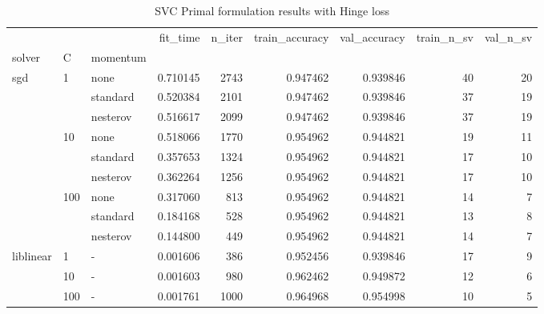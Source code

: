 \begin{table}[H]
\centering
\caption{SVC Primal formulation results with Hinge loss}
\label{primal_svc_hinge_cv_results}
\begin{tabular}{lllrrrrrr}
\toprule
          &     &   &  fit\_time &  n\_iter &  train\_accuracy &  val\_accuracy &  train\_n\_sv &  val\_n\_sv \\
solver & C & momentum &           &         &                 &               &             &           \\
\midrule
sgd & 1   & none &  0.710145 &    2743 &        0.947462 &      0.939846 &          40 &        20 \\
          &     & standard &  0.520384 &    2101 &        0.947462 &      0.939846 &          37 &        19 \\
          &     & nesterov &  0.516617 &    2099 &        0.947462 &      0.939846 &          37 &        19 \\
          & 10  & none &  0.518066 &    1770 &        0.954962 &      0.944821 &          19 &        11 \\
          &     & standard &  0.357653 &    1324 &        0.954962 &      0.944821 &          17 &        10 \\
          &     & nesterov &  0.362264 &    1256 &        0.954962 &      0.944821 &          17 &        10 \\
          & 100 & none &  0.317060 &     813 &        0.954962 &      0.944821 &          14 &         7 \\
          &     & standard &  0.184168 &     528 &        0.954962 &      0.944821 &          13 &         8 \\
          &     & nesterov &  0.144800 &     449 &        0.954962 &      0.944821 &          14 &         7 \\
liblinear & 1   & - &  0.001606 &     386 &        0.952456 &      0.939846 &          17 &         9 \\
          & 10  & - &  0.001603 &     980 &        0.962462 &      0.949872 &          12 &         6 \\
          & 100 & - &  0.001761 &    1000 &        0.964968 &      0.954998 &          10 &         5 \\
\bottomrule
\end{tabular}
\end{table}
